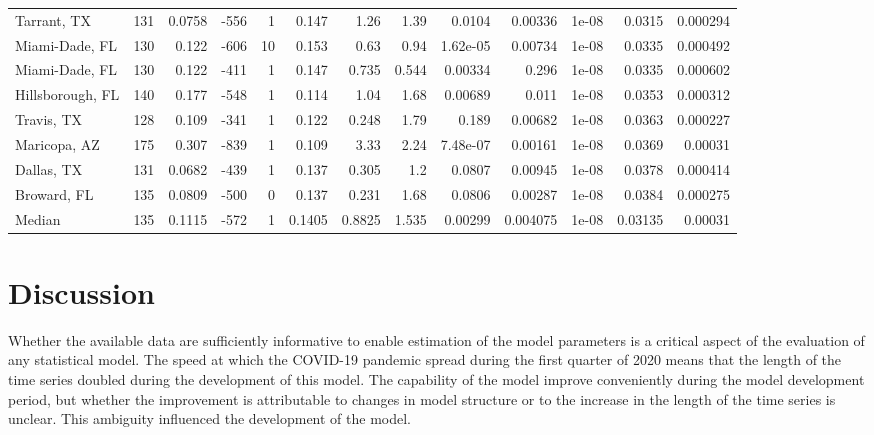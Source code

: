 \documentclass[12pt,letterpaper]{article}
\begin{document}
\begin{sidewaystable}
{\begin{tabular}{lrrrrrrrrrrrr}
 Tarrant, TX       &   131 &  0.0758 &  -556 &     1 &          0.147  &           1.26   &          1.39  &     0.0104   &     0.00336  &            1e-08 &           0.0315  &        0.000294 \\
 Miami-Dade, FL    &   130 &  0.122  &  -606 &    10 &          0.153  &           0.63   &          0.94  &     1.62e-05 &     0.00734  &            1e-08 &           0.0335  &        0.000492 \\
 Miami-Dade, FL    &   130 &  0.122  &  -411 &     1 &          0.147  &           0.735  &          0.544 &     0.00334  &     0.296    &            1e-08 &           0.0335  &        0.000602 \\
 Hillsborough, FL  &   140 &  0.177  &  -548 &     1 &          0.114  &           1.04   &          1.68  &     0.00689  &     0.011    &            1e-08 &           0.0353  &        0.000312 \\
 Travis, TX        &   128 &  0.109  &  -341 &     1 &          0.122  &           0.248  &          1.79  &     0.189    &     0.00682  &            1e-08 &           0.0363  &        0.000227 \\
 Maricopa, AZ      &   175 &  0.307  &  -839 &     1 &          0.109  &           3.33   &          2.24  &     7.48e-07 &     0.00161  &            1e-08 &           0.0369  &        0.00031  \\
 Dallas, TX        &   131 &  0.0682 &  -439 &     1 &          0.137  &           0.305  &          1.2   &     0.0807   &     0.00945  &            1e-08 &           0.0378  &        0.000414 \\
 Broward, FL       &   135 &  0.0809 &  -500 &     0 &          0.137  &           0.231  &          1.68  &     0.0806   &     0.00287  &            1e-08 &           0.0384  &        0.000275 \\
\hline
 Median            &   135 &  0.1115 &  -572 &     1 &          0.1405 &           0.8825 &          1.535 &     0.00299  &     0.004075 &            1e-08 &           0.03135 &        0.00031  \\
\hline
\end{tabular}
}\end{sidewaystable}

\clearpage
\section*{Discussion}

Whether the available data are sufficiently informative to enable
estimation of the model parameters is a critical aspect of the
evaluation of any statistical model.
The speed at which the COVID-19 pandemic spread during the first
quarter of
2020 means that the length of the time series doubled during
the development of this model. The capability of the
model improve conveniently during the model development period,
but whether the improvement is
attributable to changes in model structure or to the increase in the
length of the time series is unclear. This ambiguity influenced the
development of the model.

\cite{Sibert2017,Nielsen2014b,Chen2020}

\clearpage
\printbibliography[title=References]
\end{document}
